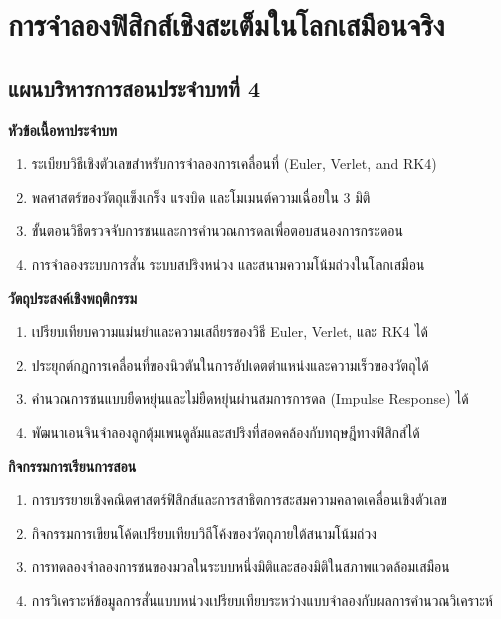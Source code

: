 \chapter{การจำลองฟิสิกส์เชิงสะเต็มในโลกเสมือนจริง}
\label{chap:ch04}

\section*{แผนบริหารการสอนประจำบทที่ 4}

\noindent\textbf{หัวข้อเนื้อหาประจำบท}
\begin{enumerate}
    \item ระเบียบวิธีเชิงตัวเลขสำหรับการจำลองการเคลื่อนที่ (Euler, Verlet, and RK4)
    \item พลศาสตร์ของวัตถุแข็งเกร็ง แรงบิด และโมเมนต์ความเฉื่อยใน 3 มิติ
    \item ขั้นตอนวิธีตรวจจับการชนและการคำนวณการดลเพื่อตอบสนองการกระดอน
    \item การจำลองระบบการสั่น ระบบสปริงหน่วง และสนามความโน้มถ่วงในโลกเสมือน
\end{enumerate}

\noindent\textbf{วัตถุประสงค์เชิงพฤติกรรม}
\begin{enumerate}
    \item เปรียบเทียบความแม่นยำและความเสถียรของวิธี Euler, Verlet, และ RK4 ได้
    \item ประยุกต์กฎการเคลื่อนที่ของนิวตันในการอัปเดตตำแหน่งและความเร็วของวัตถุได้
    \item คำนวณการชนแบบยืดหยุ่นและไม่ยืดหยุ่นผ่านสมการการดล (Impulse Response) ได้
    \item พัฒนาเอนจินจำลองลูกตุ้มเพนดูลัมและสปริงที่สอดคล้องกับทฤษฎีทางฟิสิกส์ได้
\end{enumerate}

\newpage

\noindent\textbf{กิจกรรมการเรียนการสอน}
\begin{enumerate}
    \item การบรรยายเชิงคณิตศาสตร์ฟิสิกส์และการสาธิตการสะสมความคลาดเคลื่อนเชิงตัวเลข
    \item กิจกรรมการเขียนโค้ดเปรียบเทียบวิถีโค้งของวัตถุภายใต้สนามโน้มถ่วง
    \item การทดลองจำลองการชนของมวลในระบบหนึ่งมิติและสองมิติในสภาพแวดล้อมเสมือน
    \item การวิเคราะห์ข้อมูลการสั่นแบบหน่วงเปรียบเทียบระหว่างแบบจำลองกับผลการคำนวณวิเคราะห์
\end{enumerate}

